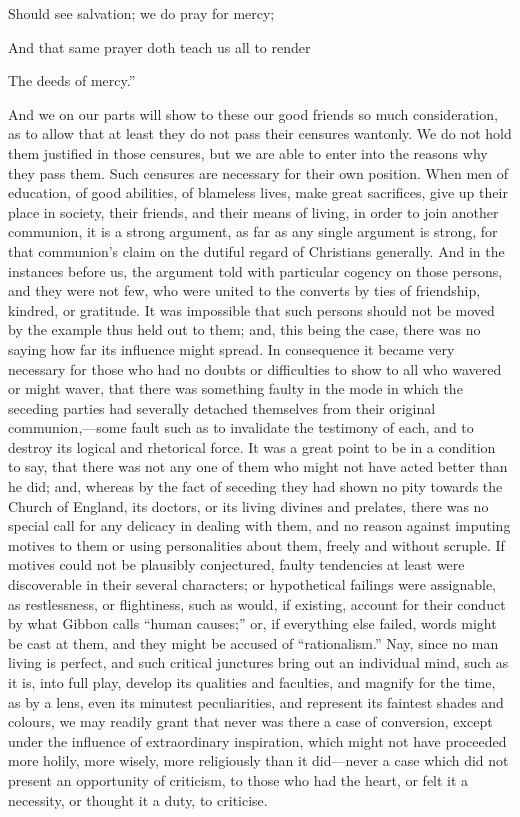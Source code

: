 Should see salvation; we do pray for mercy;

And that same prayer doth teach us all to render

The deeds of mercy.''

And we on our parts will show to these our good
friends so much consideration, as to allow that at least they do
not pass their censures wantonly. We do not hold them justified in
those censures, but we are able to enter into the reasons why they
pass them. Such censures are necessary for their own position. When
men of education, of good abilities, of blameless lives, make great
sacrifices, give up their place in society, their friends, and their
means of living, in order to join another communion, it is a strong
argument, as far as any single argument is strong, for that communion's
claim on the dutiful regard of Christians generally. And in the
instances before us, the argument told with particular cogency on
those persons, and they were not few, who were united to the converts
by ties of friendship, kindred, or gratitude. It was impossible that
such persons should not be moved by the example thus held out to them;
and, this being the case, there was no saying how far its influence
might spread. In consequence it became very necessary for those who
had no doubts or difficulties to show to all who wavered or might
waver, that there was something faulty in the mode in which the
seceding parties had severally detached themselves from their original
communion,—some fault such as to invalidate the testimony of each,
and to destroy its logical and rhetorical force. It was a great point
to be in a condition to say, that there was not any one of them who
might not have acted better than he did; and, whereas by the fact of
seceding they had shown no pity towards the Church of England, its
doctors, or its living divines and prelates, there was no special call
for any delicacy in dealing with them, and no reason against imputing
motives to them or using personalities about them, freely and without
scruple. If motives could not be plausibly conjectured, faulty
tendencies at least were discoverable in their several characters; or
hypothetical failings were assignable, as restlessness, or
flightiness, such as would, if existing, account for their conduct by
what Gibbon calls ``human causes;'' or, if everything else failed, words
might be cast at them, and they might be accused of ``rationalism.''
Nay, since no man living is perfect, and such critical junctures bring
out an individual mind, such as it is, into full play, develop its
qualities and faculties, and magnify for the time, as by a lens, even
its minutest peculiarities, and represent its faintest shades and
colours, we may readily grant that never was there a case of
conversion, except under the influence of extraordinary inspiration,
which might not have proceeded more holily, more wisely, more
religiously than it did—never a case which did not present an
opportunity of criticism, to those who had the heart, or felt it a
necessity, or thought it a duty, to criticise.

